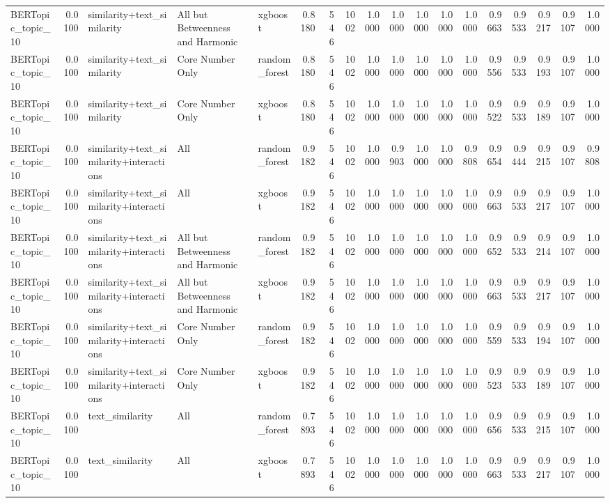 \begin{tabular}{lrlllrrrrrrrrrrrrr}
BERTopic_topic_10 & 0.0100 & similarity+text_similarity & All but Betweenness and Harmonic & xgboost & 0.8180 & 546 & 1002 & 1.0000 & 1.0000 & 1.0000 & 1.0000 & 1.0000 & 0.9663 & 0.9533 & 0.9217 & 0.9107 & 1.0000 \\
BERTopic_topic_10 & 0.0100 & similarity+text_similarity & Core Number Only & random_forest & 0.8180 & 546 & 1002 & 1.0000 & 1.0000 & 1.0000 & 1.0000 & 1.0000 & 0.9556 & 0.9533 & 0.9193 & 0.9107 & 1.0000 \\
BERTopic_topic_10 & 0.0100 & similarity+text_similarity & Core Number Only & xgboost & 0.8180 & 546 & 1002 & 1.0000 & 1.0000 & 1.0000 & 1.0000 & 1.0000 & 0.9522 & 0.9533 & 0.9189 & 0.9107 & 1.0000 \\
BERTopic_topic_10 & 0.0100 & similarity+text_similarity+interactions & All & random_forest & 0.9182 & 546 & 1002 & 1.0000 & 0.9903 & 1.0000 & 1.0000 & 0.9808 & 0.9654 & 0.9444 & 0.9215 & 0.9107 & 0.9808 \\
BERTopic_topic_10 & 0.0100 & similarity+text_similarity+interactions & All & xgboost & 0.9182 & 546 & 1002 & 1.0000 & 1.0000 & 1.0000 & 1.0000 & 1.0000 & 0.9663 & 0.9533 & 0.9217 & 0.9107 & 1.0000 \\
BERTopic_topic_10 & 0.0100 & similarity+text_similarity+interactions & All but Betweenness and Harmonic & random_forest & 0.9182 & 546 & 1002 & 1.0000 & 1.0000 & 1.0000 & 1.0000 & 1.0000 & 0.9652 & 0.9533 & 0.9214 & 0.9107 & 1.0000 \\
BERTopic_topic_10 & 0.0100 & similarity+text_similarity+interactions & All but Betweenness and Harmonic & xgboost & 0.9182 & 546 & 1002 & 1.0000 & 1.0000 & 1.0000 & 1.0000 & 1.0000 & 0.9663 & 0.9533 & 0.9217 & 0.9107 & 1.0000 \\
BERTopic_topic_10 & 0.0100 & similarity+text_similarity+interactions & Core Number Only & random_forest & 0.9182 & 546 & 1002 & 1.0000 & 1.0000 & 1.0000 & 1.0000 & 1.0000 & 0.9559 & 0.9533 & 0.9194 & 0.9107 & 1.0000 \\
BERTopic_topic_10 & 0.0100 & similarity+text_similarity+interactions & Core Number Only & xgboost & 0.9182 & 546 & 1002 & 1.0000 & 1.0000 & 1.0000 & 1.0000 & 1.0000 & 0.9523 & 0.9533 & 0.9189 & 0.9107 & 1.0000 \\
BERTopic_topic_10 & 0.0100 & text_similarity & All & random_forest & 0.7893 & 546 & 1002 & 1.0000 & 1.0000 & 1.0000 & 1.0000 & 1.0000 & 0.9656 & 0.9533 & 0.9215 & 0.9107 & 1.0000 \\
BERTopic_topic_10 & 0.0100 & text_similarity & All & xgboost & 0.7893 & 546 & 1002 & 1.0000 & 1.0000 & 1.0000 & 1.0000 & 1.0000 & 0.9663 & 0.9533 & 0.9217 & 0.9107 & 1.0000 \\

\end{tabular}
